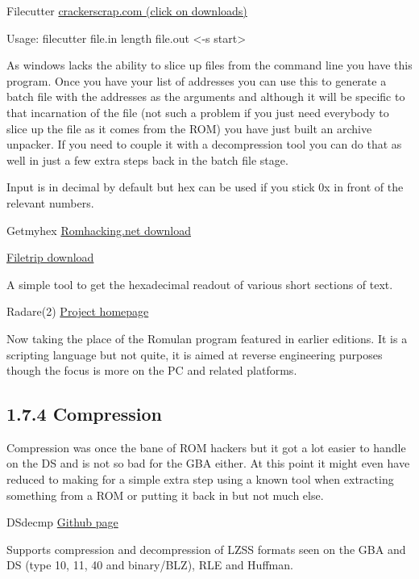 \documentclass[
]{book}
\begin{document}
Filecutter \href{http://crackerscrap.com/}{crackerscrap.com (click on downloads)}

Usage: filecutter file.in length file.out \textless-s start\textgreater{}

As windows lacks the ability to slice up files from the command line you have this program. Once you have your list of addresses you can use this to generate a batch file with the addresses as the arguments and although it will be specific to that incarnation of the file (not such a problem if you just need everybody to slice up the file as it comes from the ROM) you have just built an archive unpacker. If you need to couple it with a decompression tool you can do that as well in just a few extra steps back in the batch file stage.

Input is in decimal by default but hex can be used if you stick 0x in front of the relevant numbers.

Getmyhex \href{http://www.romhacking.net/utilities/504/}{Romhacking.net download}

\href{http://filetrip.net/pc-downloads/applications/download-getmyhex-1500-f29200.html}{Filetrip download}

A simple tool to get the hexadecimal readout of various short sections of text.

Radare(2) \href{http://radare.org/y/}{Project homepage}

Now taking the place of the Romulan program featured in earlier editions. It is a scripting language but not quite, it is aimed at reverse engineering purposes though the focus is more on the PC and related platforms.

\hypertarget{compression}{%
\subsection{1.7.4 Compression}\label{compression}}

Compression was once the bane of ROM hackers but it got a lot easier to handle on the DS and is not so bad for the GBA either. At this point it might even have reduced to making for a simple extra step using a known tool when extracting something from a ROM or putting it back in but not much else.

DSdecmp \href{https://github.com/barubary/dsdecmp}{Github page}

Supports compression and decompression of LZSS formats seen on the GBA and DS (type 10, 11, 40 and binary/BLZ), RLE and Huffman.
\end{document}
